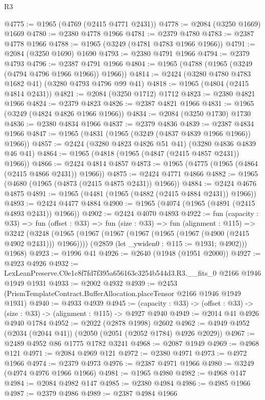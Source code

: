 \begin{lexlean}{R3}
\begin{coremodule}
@4775 := @1965 (@4769 (@2415 @4771 @2431))
@4778 := @2084 (@3250 @1669) @1669
@4780 := @2380 @4778 @1966
@4781 := @2379 @4780
@4783 := @2387 @4778 @1966
@4788 := @1965 (@3249 (@4781 @4783 @1966 @1966))
@4791 := @2084 (@3250 @1690) @1690
@4793 := @2380 @4791 @1966
@4794 := @2379 @4793
@4796 := @2387 @4791 @1966
@4804 := @1965 (@4788 (@1965 (@3249 (@4794 @4796 @1966 @1966)) @1966))
@4814 := @2424 (@3280 @4780 @4783 @1682 @41) (@3280 @4793 @4796 @99 @41)
@4818 := @1965 (@4804 (@2415 @4814 @2431))
@4821 := @2084 (@3250 @1712) @1712
@4823 := @2380 @4821 @1966
@4824 := @2379 @4823
@4826 := @2387 @4821 @1966
@4831 := @1965 (@3249 (@4824 @4826 @1966 @1966))
@4834 := @2084 (@3250 @1730) @1730
@4836 := @2380 @4834 @1966
@4837 := @2379 @4836
@4839 := @2387 @4834 @1966
@4847 := @1965 (@4831 (@1965 (@3249 (@4837 @4839 @1966 @1966)) @1966))
@4857 := @2424 (@3280 @4823 @4826 @51 @41) (@3280 @4836 @4839 @46 @41)
@4864 := @1965 (@4818 (@1965 (@4847 (@2415 @4857 @2431)) @1966))
@4866 := @2424 @4814 @4857
@4873 := @1965 (@4775 (@1965 (@4864 (@2415 @4866 @2431)) @1966))
@4875 := @2424 @4771 @4866
@4882 := @1965 (@4680 (@1965 (@4873 (@2415 @4875 @2431)) @1966))
@4884 := @2424 @4676 @4875
@4891 := @1965 (@4481 (@1965 (@4882 (@2415 @4884 @2431)) @1966))
@4893 := @2424 @4477 @4884
@4900 := @1965 (@4074 (@1965 (@4891 (@2415 @4893 @2431)) @1966))
@4902 := @2424 @4070 @4893
@4922 := fun (capacity : @33) =>
  fun (offset : @33) =>
  fun (size : @33) =>
  fun (alignment : @115) =>
  @3242
    (@3248
      (@1965
        (@1967 (@1967 (@1967 (@1965 (@1967 (@4900 (@2415 @4902 @2431))) @1966))))
        (@2859 (let _ywiden0 : @115 := @1931; @4902)))
      @1968)
@4923 := @1996 @41
@4926 := @2640 (@1948 (@1951 @2000))
@4927 := @4923 @4926
@4932 := LexLeanPreserve.C0e1c8f7fd7f395a656163c3254b544d3.R3.__fits_0 @2166 @1946 @1949 @1931
@4933 := @2002 @4932
@4939 := @2453 (PrismTemplateContract.BufferAllocation.placeTensor @2166 @1946 @1949 @1931)
@4940 := @4933 @4939
@4945 := (capacity : @33) -> (offset : @33) -> (size : @33) -> (alignment : @115) -> @4927 @4940
@4949 := @2014 @41 @4926 @4940 @1784
@4952 := @2022 (@2878 @1998) @2602
@4962 := @4949 @4952 (@2034 (@2044 @41)) (@2050 (@2051 (@2052 @1784) @4926 @2029))
@4967 := @2489 @4952 @86 @1775 @1782 @3241
@4968 := @2087 @1949
@4969 := @4968 @121
@4971 := @2084 @4969 @121
@4972 := @2380 @4971
@4973 := @4972 @1966
@4974 := @2379 @4973
@4976 := @2387 @4971 @1966
@4980 := @3249 (@4974 @4976 @1966 @1966)
@4981 := @1965 @4980
@4982 := @4968 @147
@4984 := @2084 @4982 @147
@4985 := @2380 @4984
@4986 := @4985 @1966
@4987 := @2379 @4986
@4989 := @2387 @4984 @1966

\end{coremodule}
\end{lexlean}
